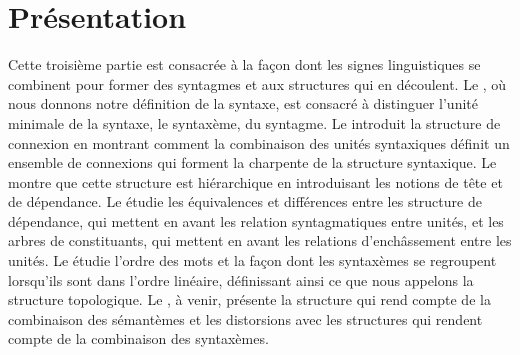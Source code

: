 \section*{Présentation}

Cette troisième partie est consacrée à la façon dont les signes linguistiques se combinent pour former des syntagmes et aux structures qui en découlent. Le , où nous donnons notre définition de la syntaxe, est consacré à distinguer l’unité minimale de la syntaxe, le syntaxème, du syntagme. Le  introduit la structure de connexion en montrant comment la combinaison des unités syntaxiques définit un ensemble de connexions qui forment la charpente de la structure syntaxique. Le  montre que cette structure est hiérarchique en introduisant les notions de tête et de dépendance. Le  étudie les équivalences et différences entre les structure de dépendance, qui mettent en avant les relation syntagmatiques entre unités, et les arbres de constituants, qui mettent en avant les relations d’enchâssement entre les unités. Le  étudie l’ordre des mots et la façon dont les syntaxèmes se regroupent lorsqu’ils sont dans l’ordre linéaire, définissant ainsi ce que nous appelons la structure topologique. Le , à venir, présente la structure qui rend compte de la combinaison des sémantèmes et les distorsions avec les structures qui rendent compte de la combinaison des syntaxèmes. 
